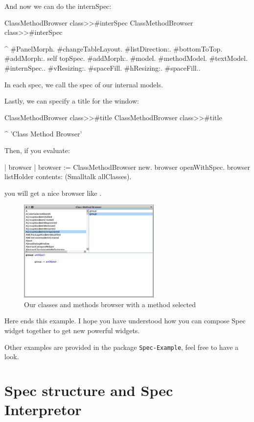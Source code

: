 \documentclass[a4paper,10pt,twoside]{book}
\begin{document}
And now we can do the internSpec:

\begin{method}{ClassMethodBrowser class>>\#interSpec}
ClassMethodBrowser class>>#interSpec

	^ { #PanelMorph.
			#changeTableLayout.
			#listDirection:. #bottomToTop.
			#addMorph:. self topSpec.
			#addMorph:. {#model. #methodModel. #textModel. #internSpec.}.
			#vResizing:. #spaceFill.
			#hResizing:. #spaceFill.}.
\end{method}
In each spec, we call the spec of our internal models.

Lastly, we can specify a title for the window:
\begin{method}{ClassMethodBrowser class>>\#title}
ClassMethodBrowser class>>#title

	^ 'Class Method Browser'
\end{method}
Then, if you evaluate:

\begin{code}{}
| browser |
browser := ClassMethodBrowser new.
browser openWithSpec.
browser listHolder contents: (Smalltalk allClasses).
\end{code}
you will get a nice browser like .


\begin{figure}[ht]
\begin{center}
	\includegraphics[width=7cm]{MethodBrowser5}
	\caption{Our classes and methods browser with a method selected}
\end{center}
\end{figure}


Here ends this example. I hope you have understood how you can compose Spec widget together to get new powerful widgets.

Other examples are provided in the package \verb?Spec-Example?, feel free to have a look.

\section{Spec structure and Spec Interpretor}
\end{document}
